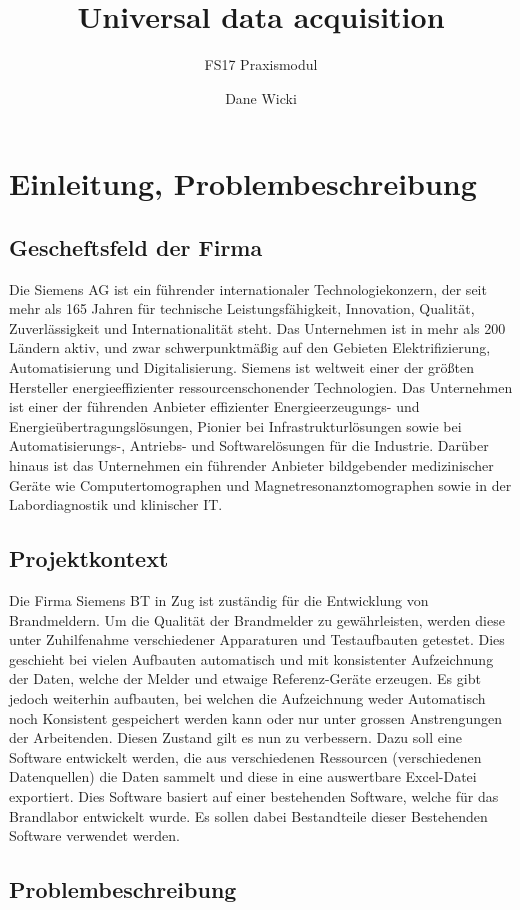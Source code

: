 \documentclass[10pt]{scrartcl}
\author{Dane Wicki}
\title{Universal data acquisition}
\subtitle{FS17 Praxismodul}
\begin{document}
\maketitle
\tableofcontents
\section{Einleitung, Problembeschreibung}
\subsection{Gescheftsfeld der Firma}
Die Siemens AG ist ein führender internationaler Technologiekonzern, der seit mehr als 165 Jahren für technische Leistungsfähigkeit, Innovation, Qualität, Zuverlässigkeit und Internationalität steht. Das Unternehmen ist in mehr als 200 Ländern aktiv, und zwar schwerpunktmäßig auf den Gebieten Elektrifizierung, Automatisierung und Digitalisierung. Siemens ist weltweit einer der größten Hersteller energieeffizienter ressourcenschonender Technologien. Das Unternehmen ist einer der führenden Anbieter effizienter Energieerzeugungs- und Energieübertragungslösungen, Pionier bei Infrastrukturlösungen sowie bei Automatisierungs-, Antriebs- und Softwarelösungen für die Industrie. Darüber hinaus ist das Unternehmen ein führender Anbieter bildgebender medizinischer Geräte wie Computertomographen und Magnetresonanztomographen sowie in der Labordiagnostik und klinischer IT.
\subsection{Projektkontext}
Die Firma Siemens BT in Zug ist zuständig für die Entwicklung von Brandmeldern.
Um die Qualität der Brandmelder zu gewährleisten, werden diese unter Zuhilfenahme
verschiedener Apparaturen und Testaufbauten getestet. Dies geschieht bei vielen Aufbauten automatisch und mit konsistenter Aufzeichnung der Daten, welche der Melder und etwaige Referenz-Geräte erzeugen. Es gibt jedoch weiterhin aufbauten, bei welchen die Aufzeichnung weder Automatisch noch Konsistent gespeichert werden kann oder nur unter grossen Anstrengungen der Arbeitenden. Diesen Zustand gilt es nun zu verbessern.
Dazu soll eine Software entwickelt werden, die aus verschiedenen Ressourcen (verschiedenen
Datenquellen) die Daten sammelt und diese in eine auswertbare Excel-Datei exportiert. Dies
Software basiert auf einer bestehenden Software, welche für das Brandlabor entwickelt wurde.
Es sollen dabei Bestandteile dieser Bestehenden Software verwendet werden.
\subsection{Problembeschreibung}
\end{document}
